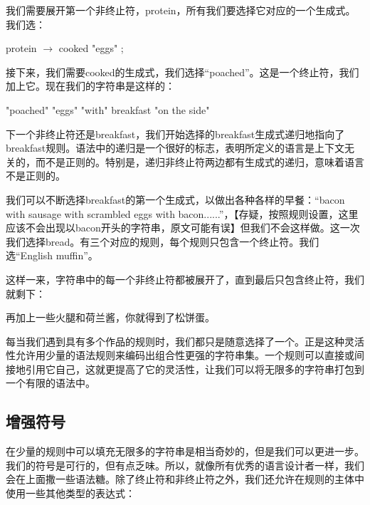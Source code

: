 \documentclass[cn,11pt,chinese]{elegantbook}
\begin{document}
我们需要展开第一个非终止符，protein，所有我们要选择它对应的一个生成式。我们选：

\begin{tcolorbox}
protein $\rightarrow$ cooked "eggs" ;
\end{tcolorbox}

接下来，我们需要cooked的生成式，我们选择“poached”。这是一个终止符，我们加上它。现在我们的字符串是这样的：

\begin{tcolorbox}
"poached" "eggs" "with" breakfast "on the side"
\end{tcolorbox}

下一个非终止符还是breakfast，我们开始选择的breakfast生成式递归地指向了breakfast规则。语法中的递归是一个很好的标志，表明所定义的语言是上下文无关的，而不是正则的。特别是，递归非终止符两边都有生成式的递归，意味着语言不是正则的。

我们可以不断选择breakfast的第一个生成式，以做出各种各样的早餐：“bacon with sausage with scrambled eggs with bacon......”，【存疑，按照规则设置，这里应该不会出现以bacon开头的字符串，原文可能有误】但我们不会这样做。这一次我们选择bread。有三个对应的规则，每个规则只包含一个终止符。我们选“English muffin”。

这样一来，字符串中的每一个非终止符都被展开了，直到最后只包含终止符，我们就剩下：

再加上一些火腿和荷兰酱，你就得到了松饼蛋。

每当我们遇到具有多个作品的规则时，我们都只是随意选择了一个。正是这种灵活性允许用少量的语法规则来编码出组合性更强的字符串集。一个规则可以直接或间接地引用它自己，这就更提高了它的灵活性，让我们可以将无限多的字符串打包到一个有限的语法中。

\subsection{增强符号}

在少量的规则中可以填充无限多的字符串是相当奇妙的，但是我们可以更进一步。我们的符号是可行的，但有点乏味。所以，就像所有优秀的语言设计者一样，我们会在上面撒一些语法糖。除了终止符和非终止符之外，我们还允许在规则的主体中使用一些其他类型的表达式：
\end{document}
